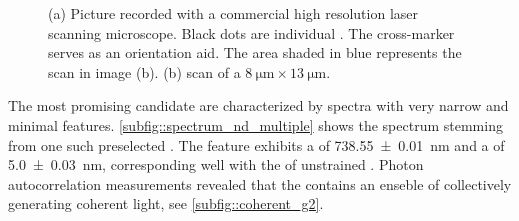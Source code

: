 			\begin{figure}[htp]
				\begin{subfigure}[t]{ 0.49\linewidth}
					\centering
					\caption{}
					\label{subfig::cross_laser_scan}
				\end{subfigure}
				\hfill
				\begin{subfigure}[t]{ 0.49\linewidth}
					\centering
					\caption{}
					\label{subfig::pp_pl_scan}
				\end{subfigure}
				\caption[Localizing suitable \nds]{(a) Picture recorded with a commercial high resolution laser scanning microscope. Black dots are individual \nds. The cross-marker serves as an orientation aid. The area shaded in blue represents the \pl scan in image (b). (b) \Pl scan of a
				$\SI{8}{\micro\metre} \times \SI{13}{\micro\metre}$. }
			\end{figure}

			The most promising candidate \nds are characterized by \fl spectra with very narrow \zpls and minimal \psb features. \autoref{subfig::spectrum_nd_multiple} shows the spectrum stemming from one such preselected \nd.
			The \ZPL feature exhibits a \cwl of \SI[separate-uncertainty = true]{738.55\pm0.01}{nm} and a \lw of \SI[separate-uncertainty = true]{5.0\pm0.03}{nm}, corresponding well with the \ZPL of unstrained \sivs. Photon autocorrelation measurements revealed that the \nd  contains an enseble of \sivs collectively generating coherent \fl light, see \autoref{subfig::coherent_g2}.

